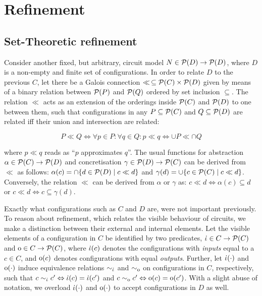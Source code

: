 \section{Refinement}

\subsection{Set-Theoretic refinement}

Consider another fixed, but arbitrary, circuit model $N \in \mathcal{P}(D) \rightarrow \mathcal{P}(D)$, where $D$ is a non-empty and finite set of configurations. In order to relate $D$ to the previous $C$, let there be a Galois connection $\ll \, \subseteq \mathcal{P}(C) \times \mathcal{P}(D)$ given by means of a binary relation between $\mathcal{P}(P)$ and $\mathcal{P}(Q)$ ordered by set inclusion $\subseteq$. The relation $\ll$ acts as an extension of the orderings inside $\mathcal{P}(C)$ and $\mathcal{P}(D)$ to one between them, such that configurations in any $P \subseteq \mathcal{P}(C)$ and $Q \subseteq \mathcal{P}(D)$ are related iff their union and intersection are related:

\begin{equation*}
P \ll Q \iff \forall p \in P : \forall q \in Q : p \ll q \iff \cup P \ll \cap Q
\end{equation*}

\noindent where $p \ll q$ reads as ``$p$ approximates $q$''. The usual functions for abstraction $\alpha \in \mathcal{P}(C) \rightarrow \mathcal{P}(D)$ and concretisation $\gamma \in \mathcal{P}(D) \rightarrow \mathcal{P}(C)$ can be derived from $\ll$ as follows: $\alpha(c) = \cap \{ d \in \mathcal{P}(D) \mid c \ll d \}$ and $\gamma(d) = \cup \{ c \in \mathcal{P}(C) \mid c \ll d \}$. Conversely, the relation $\ll$ can be derived from $\alpha$ or $\gamma$ as: $c \ll d \iff \alpha(c) \subseteq d$ or $c \ll d \iff c \subseteq \gamma(d)$. 

Exactly what configurations such as $C$ and $D$ are, were not important previously. To reason about refinement, which relates the visible behaviour of circuits, we make a distinction between their external and internal elements. Let the visible elements of a configuration in $C$ be identified by two predicates, $\dot{\iota} \in C \rightarrow \mathcal{P}(C)$ and $\mathrm{o} \in C \rightarrow \mathcal{P}(C)$, where $\dot{\iota}(c)$ denotes the configurations with \textit{inputs} equal to a $c \in C$, and $\mathrm{o}(c)$ denotes configurations with equal \textit{outputs}. Further, let $\dot{\iota}(\cdot)$ and $\mathrm{o}(\cdot)$ induce equivalence relations $\sim_{\dot{\iota}}$ and $\sim_{\mathrm{o}}$ on configurations in $C$, respectively, such that $c \sim_{\dot{\iota}} c' \Leftrightarrow \dot{\iota}(c) = \dot{\iota}(c')$ and $c \sim_{\mathrm{o}} c' \Leftrightarrow \mathrm{o}(c) = \mathrm{o}(c')$. With a slight abuse of notation, we overload $\dot{\iota}(\cdot)$ and $\mathrm{o}(\cdot)$ to accept configurations in $D$ as well.


